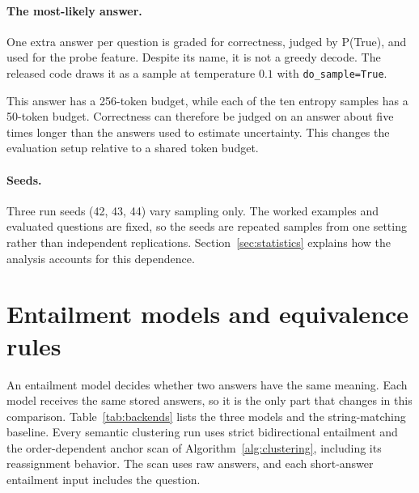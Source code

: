 \paragraph{The most-likely answer.} One extra answer per question is graded for
correctness, judged by P(True), and used for the probe feature. Despite its
name, it is not a greedy decode. The released code draws it as a sample at
temperature $0.1$ with \texttt{do\_sample=True}.

This answer has a 256-token budget, while each of the ten entropy samples has a
50-token budget. Correctness can therefore be judged on an answer about five
times longer than the answers used to estimate uncertainty. This changes the
evaluation setup relative to a shared token budget.

\paragraph{Seeds.} Three run seeds (42, 43, 44) vary sampling only. The worked
examples and evaluated questions are fixed, so the seeds are repeated samples
from one setting rather than independent replications. Section~\ref{sec:statistics}
explains how the analysis accounts for this dependence.

\section{Entailment models and equivalence rules}
\label{sec:backends}

An entailment model decides whether two answers have the same meaning. Each
model receives the same stored answers, so it is the only part that changes in
this comparison. Table~\ref{tab:backends} lists the three models and the
string-matching baseline. Every semantic clustering run uses strict
bidirectional entailment and
the order-dependent anchor scan of Algorithm~\ref{alg:clustering}, including
its reassignment behavior. The scan uses raw answers, and each short-answer
entailment input includes the question.

